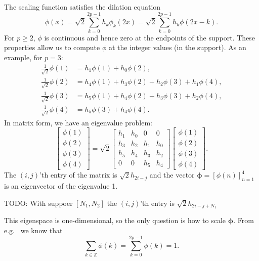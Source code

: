 \documentclass[a4paper]{scrartcl}
\newcommand{\vv}[1]{\ensuremath{\bm{#1}}}
\begin{document}
The scaling function satisfies the dilation equation
\begin{equation}
	\label{eq:internal_scaling_function_definition}
	\phi(x) 
	= \sqrt2 \sum_{k=0}^{2p-1} h_k \phi_k(2x)
	= \sqrt2 \sum_{k=0}^{2p-1} h_k \phi(2x - k).
\end{equation}
For $p\geq2$, $\phi$ is continuous and hence zero at the endpoints of the support.
These properties allow us to compute $\phi$ at the integer values (in the support).
As an example, for $p=3$:
\begin{align*}
	\frac1{\sqrt2} \phi(1) 
	& = h_1\phi(1) + h_0\phi(2),
	\\
	\frac1{\sqrt2} \phi(2)
	& = h_4\phi(1) + h_3\phi(2) + h_2\phi(3) + h_1\phi(4),
	\\
	\frac1{\sqrt2} \phi(3)
	& = h_5\phi(1) + h_4\phi(2) + h_3\phi(3) + h_2\phi(4),
	\\
	\frac1{\sqrt2} \phi(4)
	& = h_5\phi(3) + h_4\phi(4).
\end{align*}
In matrix form, we have an eigenvalue problem:
\begin{equation*}
	\begin{bmatrix}
		\phi(1) \\ \phi(2) \\ \phi(3) \\ \phi(4)
	\end{bmatrix}
	=
	\sqrt2
	\begin{bmatrix}
		h_1 & h_0 & 0 & 0
		\\
		h_3 & h_2 & h_1 & h_0
		\\
		h_5 & h_4 & h_3 & h_2
		\\
		0 & 0 & h_5 & h_4
	\end{bmatrix}
	\begin{bmatrix}
		\phi(1) \\ \phi(2) \\ \phi(3) \\ \phi(4)
	\end{bmatrix}.
\end{equation*}
The $(i,j)$'th entry of the matrix is $\sqrt2 h_{2i-j}$ and the vector $\vv\phi = [\phi(n)]_{n=1}^4$ is an eigenvector of the eigenvalue 1.

TODO: With suppoer $[N_1, N_2]$ the $(i,j)$'th entry is $\sqrt2 h_{2i-j+N_1}$

This eigenspace is one-dimensional, so the only question is how to scale $\vv\phi$.
From e.g.\ \cite[page 69]{Cohen:Daubechies:Vial:1993} we know that
\begin{equation*}
	\sum_{k\in\mathbb{Z}} \phi(k)
	= \sum_{k=0}^{2p-1} \phi(k)
	= 1.
\end{equation*}
\end{document}
